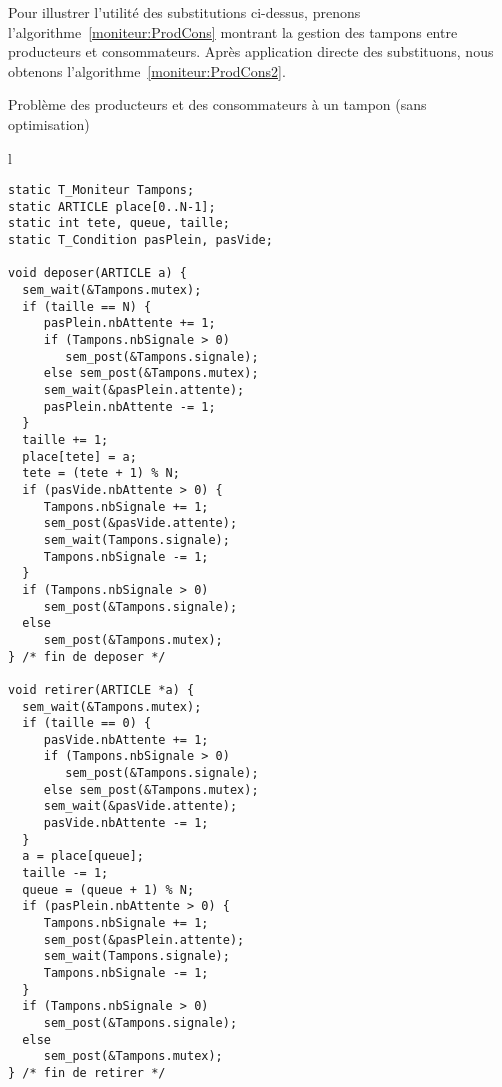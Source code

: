 Pour illustrer l'utilité des substitutions ci-dessus, prenons l'algorithme~\ref{moniteur:ProdCons} montrant la gestion des tampons entre producteurs et consommateurs. Après application directe des substituons, nous obtenons l'algorithme~\ref{moniteur:ProdCons2}.
\begin{algorithm}[!ht]
\caption{Problème des producteurs et des consommateurs à un tampon (sans optimisation)}\label{moniteur:ProdCons2}
\centering
\begin{tabular}{l}
\lstset{language=C++}
\begin{lstlisting}
static T_Moniteur Tampons;
static ARTICLE place[0..N-1];
static int tete, queue, taille;
static T_Condition pasPlein, pasVide;

void deposer(ARTICLE a) {
  sem_wait(&Tampons.mutex);
  if (taille == N) {
     pasPlein.nbAttente += 1;
     if (Tampons.nbSignale > 0)
        sem_post(&Tampons.signale);
     else sem_post(&Tampons.mutex);
     sem_wait(&pasPlein.attente);
     pasPlein.nbAttente -= 1;
  }
  taille += 1;
  place[tete] = a;
  tete = (tete + 1) % N;
  if (pasVide.nbAttente > 0) {
     Tampons.nbSignale += 1;
     sem_post(&pasVide.attente);
     sem_wait(Tampons.signale);
     Tampons.nbSignale -= 1;
  }
  if (Tampons.nbSignale > 0)
     sem_post(&Tampons.signale);
  else
     sem_post(&Tampons.mutex);
} /* fin de deposer */

void retirer(ARTICLE *a) {
  sem_wait(&Tampons.mutex);
  if (taille == 0) {
     pasVide.nbAttente += 1;
     if (Tampons.nbSignale > 0)
        sem_post(&Tampons.signale);
     else sem_post(&Tampons.mutex);
     sem_wait(&pasVide.attente);
     pasVide.nbAttente -= 1;
  }
  a = place[queue];
  taille -= 1;
  queue = (queue + 1) % N;
  if (pasPlein.nbAttente > 0) {
     Tampons.nbSignale += 1;
     sem_post(&pasPlein.attente);
     sem_wait(Tampons.signale);
     Tampons.nbSignale -= 1;
  }
  if (Tampons.nbSignale > 0)
     sem_post(&Tampons.signale);
  else
     sem_post(&Tampons.mutex);
} /* fin de retirer */
\end{lstlisting}
\end{tabular}

\end{algorithm}

